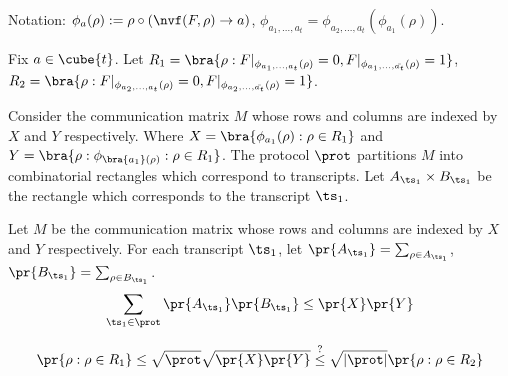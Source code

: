 Notation:
$\phi_{a}(\rho) := \rho \circ(\nvf(F,\rho) \to a)$, 
$\phi_{a_1,\dots, a_t} = \phi_{a_2,\dots,a_t}(\phi_{a_1}(\rho))$.

Fix $a \in \cube{t}$.
Let $R_1 = \bra{\rho:F|_{\phi_{a_1,\dots,a_t}(\rho)} = 0, F|_{\phi_{a_1,\dots,\bar{a_t}}(\rho)} = 1 }$,
$R_2 = \bra{\rho: F|_{\phi_{a_2,\dots,a_t}(\rho)} = 0, F|_{\phi_{a_2,\dots,\bar{a_t}}(\rho)} = 1}$.

Consider the communication matrix $M$ whose rows and columns are indexed by $X$ and $Y$ respectively. Where $X = \bra{\phi_{a_1}(\rho): \rho \in R_1}$ and $Y = \bra{\rho : \phi_{\bra{a_1}(\rho)}: \rho \in R_1}$. The protocol $\prot$ partitions $M$ into combinatorial rectangles which correspond to transcripts.  Let $A_{\ts_1} \times B_{\ts_1}$ be the rectangle which corresponds to the transcript $\ts_1$. 

\begin{claim}
    \label{calim: prob rectangles}
        Let $M$ be the communication matrix whose rows and columns are indexed by $X$ and $Y$ respectively. For each transcript $\ts_1$, let
        $\pr{A_{\ts_1}} = \sum_{\rho \in A_{\ts_1}}$, $\pr{B_{\ts_1}} = \sum_{\rho \in B_{\ts_1}}$.
        \[
        \sum_{\ts_1 \in \prot} \pr{A_{\ts_1}} \pr{B_{\ts_1}} \leq \pr{X} \pr{Y}
        \]
                
\end{claim}

\begin{claim}
    \[
    \pr{\rho: \rho \in R_1} \leq \sqrt{\prot} \sqrt{\pr{X} \pr{Y}} \overset{?}{\leq} \sqrt{|\prot|}\pr{\rho: \rho \in R_2}
    \]
\end{claim}


